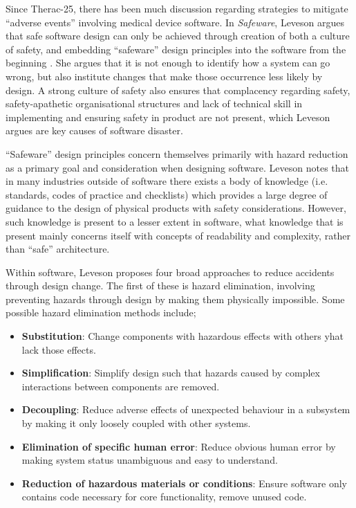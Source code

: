 \documentclass{cshonours}
\newcommand{\ther}{Therac-25\xspace}
\begin{document}
Since \ther, there has been much discussion regarding strategies to mitigate ``adverse events'' involving medical device software. In \textit{Safeware}, Leveson argues that safe software design can only be achieved through creation of both a culture of safety, \cite[ch.~4]{safeware} and embedding ``safeware'' design principles into the software from the beginning \cite[ch.~16]{safeware}. She argues that it is not enough to identify how a system can go wrong, but also institute changes that make those occurrence less likely by design. A strong culture of safety also ensures that complacency regarding safety, safety-apathetic organisational structures and lack of technical skill in implementing and ensuring safety in product are not present, which Leveson argues are key causes of software disaster.

``Safeware'' design principles concern themselves primarily with hazard reduction as a primary goal and consideration when designing software. Leveson notes that in many industries outside of software there exists a body of knowledge (i.e. standards, codes of practice and checklists) which provides a large degree of guidance to the design of physical products with safety considerations. However, such knowledge is present to a lesser extent in software, what knowledge that is present mainly concerns itself with concepts of readability and complexity, rather than ``safe'' architecture.

Within software, Leveson proposes four broad approaches to reduce accidents through design change. The first of these is hazard elimination, involving preventing hazards through design by making them physically impossible. Some possible hazard elimination methods include;
 \begin{itemize}
  \item \textbf{Substitution}: Change components with hazardous effects with others yhat lack those effects.
  \item \textbf{Simplification}: Simplify design such that hazards caused by complex interactions between components are removed.
  \item \textbf{Decoupling}: Reduce adverse effects of unexpected behaviour in a subsystem by making it only loosely coupled with other systems.
  \item \textbf{Elimination of specific human error}: Reduce obvious human error by making system status unambiguous and easy to understand.
  \item \textbf{Reduction of hazardous materials or conditions}: Ensure software only contains code necessary for core functionality, remove unused code.
 \end{itemize}
 
\end{document}
